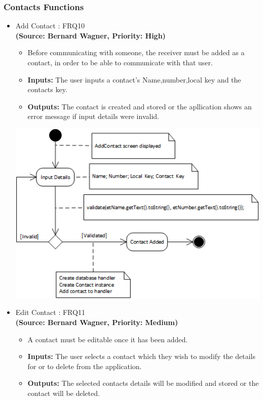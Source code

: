 \subsubsection{Contacts Functions}
\begin{itemize}
\item{Add Contact : FRQ10}\\
\textbf{(Source: Bernard Wagner, Priority: High)}
\begin{itemize}
\item Before communicating with someone, the receiver must be added as a contact, in order to be able to communicate with that user.
\item \textbf{Inputs:} The user inputs a contact's Name,number,local key and the contacts key.
\item \textbf{Outputs:} The contact is created and stored or the apllication shows an error message if input details were invalid.
\end{itemize}
 \includegraphics[width=13cm]{diagrams/StateDiagrams/AddContactStateDiagram.png}
\item{Edit Contact : FRQ11}\\
\textbf{(Source: Bernard Wagner, Priority: Medium)}
\begin{itemize}
\item A contact must be editable once it has been added.
\item \textbf{Inputs:} The user selects a contact which they wish to modify the details for or to delete from the application.
\item \textbf{Outputs:} The selected contacts details will be modified and stored or the contact will be deleted.
\end{itemize}

\end{itemize}
